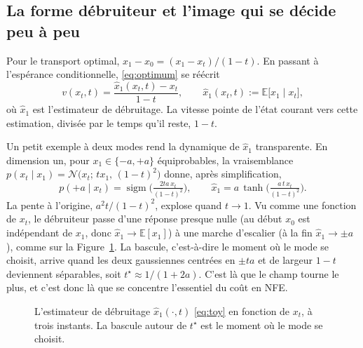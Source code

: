 \documentclass[11pt]{article}
\newcommand{\sigm}{\operatorname{sigm}}
\begin{document}
\subsection{La forme débruiteur et l'image qui se décide peu à peu}
\label{sec:denoiser}

Pour le transport optimal, $x_1 - x_0 = (x_1 - x_t)/(1-t)$. En passant à l'espérance conditionnelle,
\eqref{eq:optimum} se réécrit
\begin{equation}
v(x_t, t) = \frac{\hat{x}_1(x_t,t) - x_t}{1 - t}, \qquad \hat{x}_1(x_t,t) := \mathbb{E}\big[x_1 \mid x_t\big],
\label{eq:denoiser}
\end{equation}
où $\hat{x}_1$ est l'estimateur de débruitage. La vitesse pointe de l'état courant vers cette estimation,
divisée par le temps qu'il reste, $1-t$.

Un petit exemple à deux modes rend la dynamique de $\hat{x}_1$ transparente. En dimension un, pour $x_1 \in
\{-a, +a\}$ équiprobables, la vraisemblance $p(x_t \mid x_1) = \mathcal{N}\big(x_t;\, t x_1,\, (1-t)^2\big)$
donne, après simplification,
\begin{equation}
p(+a \mid x_t) = \sigm\!\Big(\tfrac{2ta\,x_t}{(1-t)^2}\Big),
\qquad
\hat{x}_1 = a\,\tanh\!\Big(\tfrac{a\,t\,x_t}{(1-t)^2}\Big).
\label{eq:toy}
\end{equation}
La pente à l'origine, $a^2 t / (1-t)^2$, explose quand $t \to 1$. Vu comme une fonction de $x_t$, le
débruiteur passe d'une réponse presque nulle (au début $x_0$ est indépendant de $x_1$, donc $\hat{x}_1 \to
\mathbb{E}[x_1]$) à une marche d'escalier (à la fin $\hat{x}_1 \to \pm a$), comme sur la
Figure~\ref{fig:denoiser}. La bascule, c'est-à-dire le moment où le mode se choisit, arrive quand les deux
gaussiennes centrées en $\pm ta$ et de largeur $1-t$ deviennent séparables, soit $t^\star \approx 1/(1+2a)$.
C'est là que le champ tourne le plus, et c'est donc là que se concentre l'essentiel du coût en NFE.

\begin{figure}[htbp]
\centering
{}
\caption{L'estimateur de débruitage $\hat{x}_1(\cdot,t)$ \eqref{eq:toy} en fonction de $x_t$, à trois
instants. La bascule autour de $t^\star$ est le moment où le mode se choisit.}
\label{fig:denoiser}
\end{figure}
\end{document}
